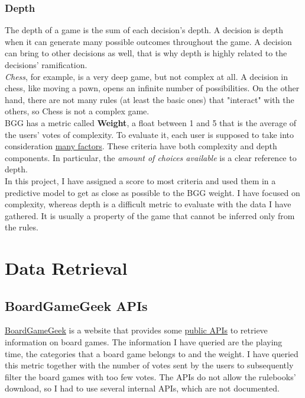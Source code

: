 \documentclass[runningheads]{llncs}
\begin{document}
\subsubsection{Depth}
The depth of a game is the sum of each decision's depth. A decision is depth when it can generate many possible outcomes throughout the game. A decision can bring to other decisions as well, that is why depth is highly related to the decisions' ramification.  \\

\textit{Chess}, for example, is a very deep game, but not complex at all. A decision in chess, like moving a pawn, opens an infinite number of possibilities. On the other hand, there are not many rules (at least the basic ones) that "interact" with the others, so Chess is not a complex game. \\

BGG has a metric called \textbf{Weight}, a float between 1 and 5 that is the average of the users' votes of complexity. To evaluate it, each user is supposed to take into consideration \href{https://boardgamegeek.com/wiki/page/Weight}{many factors}. These criteria have both complexity and depth components. In particular, the \textit{amount of choices available} is a clear reference to depth. \\
In this project, I have assigned a score to most criteria and used them in a predictive model to get as close as possible to the BGG weight. I have focused on complexity, whereas depth is a difficult metric to evaluate with the data I have gathered. It is usually a property of the game that cannot be inferred only from the rules. 

\section{Data Retrieval}
\subsection{BoardGameGeek APIs}
\href{https://boardgamegeek.com}{BoardGameGeek} is a website that provides some \href{https://boardgamegeek.com/wiki/page/BGG_XML_API2}{public APIs} to retrieve information on board games. The information I have queried are the playing time, the categories that a board game belongs to and the weight. I have queried this metric together with the number of votes sent by the users to subsequently filter the board games with too few votes. The APIs do not allow the rulebooks' download, so I had to use several internal APIs, which are not documented. 
\end{document}
